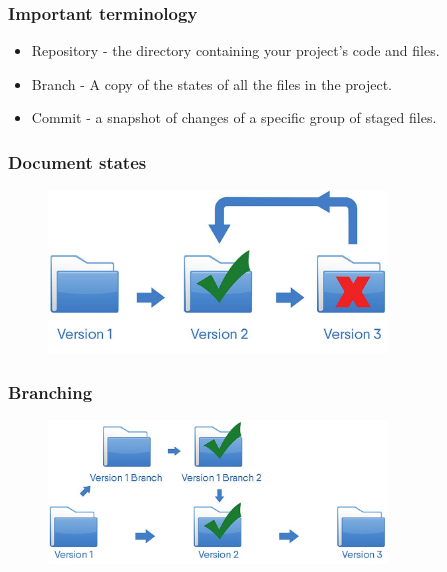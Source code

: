 \begin{frame}[t]
    \frametitle{Important terminology}
    
    \begin{itemize}
        \item Repository - the directory containing your project's code and files.
        \item Branch - A copy of the states of all the files in the project.
        \item Commit - a snapshot of changes of a specific group of staged files.
    \end{itemize}
\end{frame}

\begin{frame}
  \frametitle{Document states}
  \begin{figure}[htpb]
      \centering
      \includegraphics[width=0.8\textwidth]{images/singleton-vc.png}
  \end{figure}
\end{frame}

\begin{frame}
    \frametitle{Branching}
    \begin{figure}[htpb]
        \centering
        \includegraphics[width=0.8\textwidth]{images/branching-vc.png}
    \end{figure} 
\end{frame}

